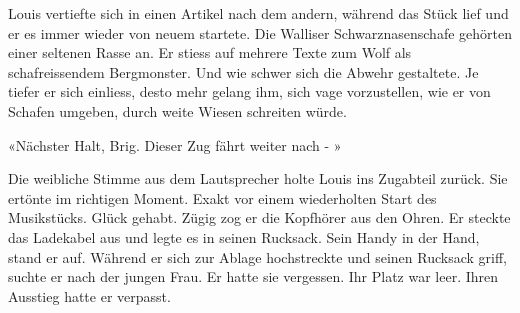 Louis vertiefte sich in einen Artikel nach dem andern, während das Stück
lief und er es immer wieder von neuem startete. Die Walliser Schwarznasenschafe gehörten einer seltenen Rasse an. 
Er stiess auf mehrere Texte zum Wolf als schafreissendem Bergmonster. Und wie schwer sich die Abwehr gestaltete. Je tiefer er sich einliess, desto mehr gelang ihm, sich vage vorzustellen, wie er von Schafen umgeben, durch weite Wiesen schreiten würde.

«Nächster Halt, Brig. Dieser Zug fährt weiter nach - »

Die weibliche Stimme aus dem Lautsprecher holte Louis ins
Zugabteil zurück. Sie ertönte im richtigen Moment. Exakt vor einem
wiederholten Start des Musikstücks. Glück gehabt. Zügig zog er die Kopfhörer
aus den Ohren. Er steckte das Ladekabel aus und legte es in seinen
Rucksack. Sein Handy in der Hand, stand er auf.
Während er sich zur Ablage hochstreckte und seinen Rucksack griff,
suchte er nach der jungen Frau. Er hatte sie vergessen. Ihr Platz war
leer. Ihren Ausstieg hatte er verpasst.
